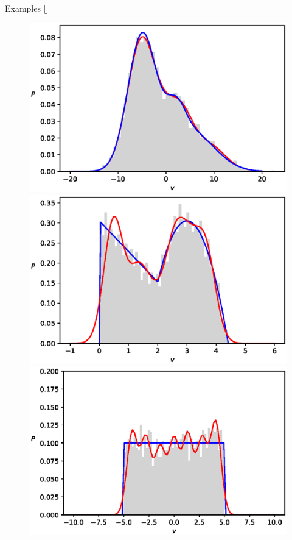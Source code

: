 \documentclass[10pt]{beamer}
\begin{document}
\begin{frame}{Examples \hfill \small [\cite{2020}]}
\begin{figure}[t!]
\begin{center}
        \includegraphics[scale=0.30]{figures/Gaussians}    
        \includegraphics[scale=0.30]{figures/Likas2}  
        \includegraphics[scale=0.30]{figures/Likas1}


\end{center}
\end{figure}
\end{frame}
\end{document}
